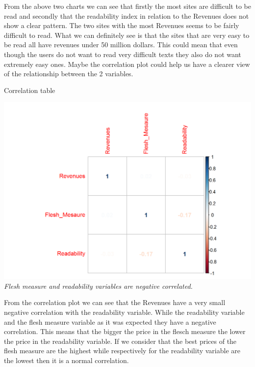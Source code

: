 \documentclass{book}
\begin{document}
From the above two charts we can see that firstly the most sites are difficult to be read and secondly that the readability index in relation to the Revenues does not show a clear pattern. The two sites with the most Revenues seems to be fairly difficult to read. What we can definitely see is that the sites that are very easy to be read all have revenues under 50 million dollars. This could mean that even though the users do not want to read very difficult texts they also do not want extremely easy ones. Maybe the correlation plot could help us have a clearer view of the relationship between the 2 variables.
\begin{table}[H]
\centering
\caption{Correlation table}
\begin{center}
\includegraphics[scale=0.5]{../R/photos/43_read_cor.png}    \\
\textit{Flesh measure and readability variables are negative correlated.}
\end{center}
\end{table}
From the correlation plot we can see that the Revenues have a very small negative correlation with the readability variable. While the readability variable and the flesh measure variable as it was expected they have a negative correlation. This means that the bigger the price in the flesch measure the lower the price in the readability variable. If we consider that the best prices of the flesh measure are the highest while respectively for the readability variable are the lowest then it is a normal correlation.
\end{document}
